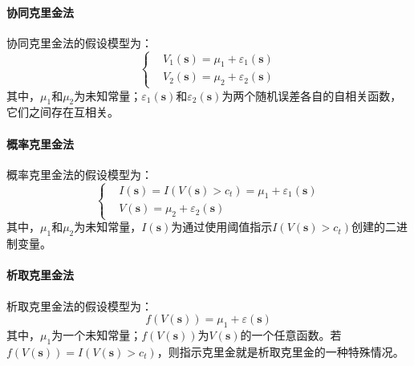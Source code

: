 \paragraph{协同克里金法}
协同克里金法的假设模型为：
\begin{equation}
    \left\{
    \begin{aligned}
         & V_{1}\left( \mathbf{s} \right) = \mu_{1} + \varepsilon_{1}\left( \mathbf{s} \right) \\
         & V_{2}\left( \mathbf{s} \right) = \mu_{2} + \varepsilon_{2}\left( \mathbf{s} \right)
    \end{aligned}
    \right.
\end{equation}
其中，$ \mu_{1} $和$ \mu_{2} $为未知常量；$ \varepsilon_{1}\left( \mathbf{s} \right) $和$ \varepsilon_{2}\left( \mathbf{s} \right) $为两个随机误差各自的自相关函数，它们之间存在互相关。
\paragraph{概率克里金法}
概率克里金法的假设模型为：
\begin{equation}
    \left\{
    \begin{aligned}
         & I\left( \mathbf{s} \right) = I\left( V\left( \mathbf{s} \right) > c_{t} \right) = \mu_{1} + \varepsilon_{1}\left( \mathbf{s} \right) \\
         & V\left( \mathbf{s} \right) = \mu_{2} + \varepsilon_{2}\left( \mathbf{s} \right)
    \end{aligned}
    \right.
\end{equation}
其中，$ \mu_{1} $和$ \mu_{2} $为未知常量，$ I\left( \mathbf{s} \right) $为通过使用阈值指示$ I\left( V\left( \mathbf{s} \right) > c_{t} \right) $创建的二进制变量。
\paragraph{析取克里金法}
析取克里金法的假设模型为：
\begin{equation}
    f\left( V\left( \mathbf{s} \right) \right) = \mu_{1} + \varepsilon\left( \mathbf{s} \right)
\end{equation}
其中，$ \mu_{1} $为一个未知常量；$ f\left( V\left( \mathbf{s} \right) \right) $为$ V\left( \mathbf{s} \right) $的一个任意函数。若$ f\left( V\left( \mathbf{s} \right) \right) = I\left( V\left( \mathbf{s} \right) > c_{t} \right) $，则指示克里金就是析取克里金的一种特殊情况。